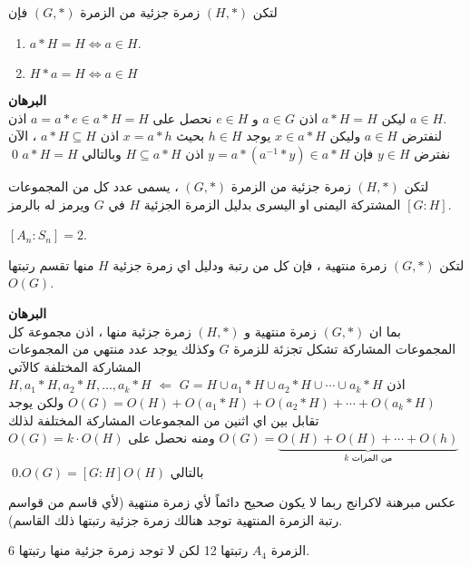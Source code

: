  \begin{theorem}
 	لتكن $(H, *)$ زمرة جزئية من الزمرة $(G, *)$ فإن
 	\begin{enumerate}
 		\item $a*H=H \iff a\in H$.
 		\item $H*a = H \iff a\in H$
 	\end{enumerate}
 \end{theorem}
 \noindent
 \textbf{البرهان}\\
 \noindent
 ليكن $a*H=H$ اذن $a\in G$ و $e\in H$ نحصل على $a = a*e \in a*H =H$ اذن $a\in H$.\\
 لنفترض $a\in H$ وليكن $x \in a*H$ يوجد $h\in H$ بحيث $x=a*h$ اذن $a*H\subseteq H$ ، الآن نفترض $y\in H$ فإن 
 $y =a*(a^{-1}*y)  \in a*H $ 
 اذن $H\subseteq a*H$ وبالتالي $a*H = H$ \qed
 
 \begin{definition}
 	لتكن $(H, *)$ زمرة جزئية من الزمرة $(G, *)$ ، يسمى عدد كل من المجموعات المشتركة اليمنى او  اليسرى بدليل الزمرة الجزئية $H$ في $G$ ويرمز له بالرمز $[G:H]$.
 \end{definition}
 \begin{example}
 	$[A_n : S_n] = 2$.
 \end{example}
 
 \begin{theorem}
 	لتكن $(G, *)$ زمرة منتهية ، فإن كل من رتبة ودليل اي زمرة جزئية $H$ منها تقسم رتبتها $O(G)$. 
 \end{theorem}
 \noindent
 \textbf{البرهان}\\
 \noindent
 بما ان $(G, *)$ زمرة منتهية و $(H, *)$ زمرة جزئية منها ، اذن مجموعة كل المجموعات المشاركة تشكل تجزئة للزمرة $G$ وكذلك يوجد عدد منتهي من المجموعات المشاركة المختلفة كالآتي\\
 $H, a_1*H, a_2*H, \dots, a_k*H$ $\Leftarrow$
 $
 G= H\cup a_1 * H \cup a_2*H \cup \cdots \cup a_k*H
 $
 اذن 
 $O(G) = O(H) + O(a_1*H) + O(a_2*H) + \cdots + O(a_k*H)$
ولكن يوجد تقابل بين اي اثنين من المجموعات المشاركة المختلفة لذلك 
$O(G) = \underbrace{O(H)+O(H)+\cdots+O(h)}_{\text{$k$ من المرات}} $ 
 ومنه نحصل على $O(G) = k\cdot O(H) $ بالتالي $O(G) = [G:H] O(H)$.\qed
 
 \begin{note}
 	عكس مبرهنة لاكرانج ربما لا يكون صحيح دائماً لأي زمرة منتهية (لأي قاسم من قواسم رتبة الزمرة المنتهية توجد هنالك زمرة جزئية رتبتها ذلك القاسم).
 \end{note}
 
 \begin{example}
 	الزمرة $A_4$ رتبتها 12 لكن لا توجد زمرة جزئية منها رتبتها 6.
 \end{example}
 
